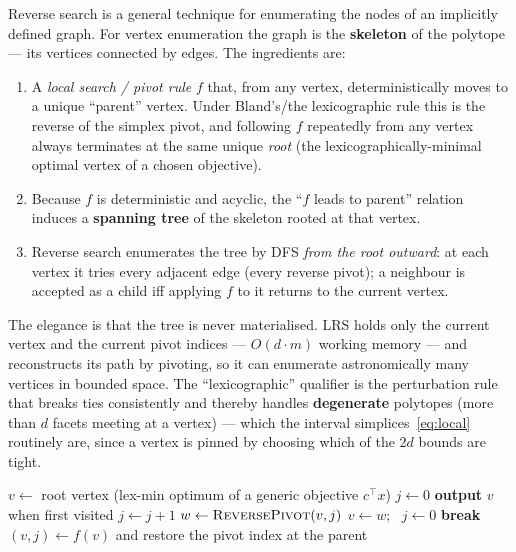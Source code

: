 \documentclass[11pt]{article}
\begin{document}
Reverse search is a general technique for enumerating the nodes of an implicitly defined
graph. For vertex enumeration the graph is the \textbf{skeleton} of the polytope --- its
vertices connected by edges. The ingredients are:
\begin{enumerate}
  \item A \emph{local search / pivot rule} $f$ that, from any vertex, deterministically
    moves to a unique ``parent'' vertex. Under Bland's/the lexicographic rule this is
    the reverse of the simplex pivot, and following $f$ repeatedly from any vertex always
    terminates at the same unique \emph{root} (the lexicographically-minimal optimal
    vertex of a chosen objective).
  \item Because $f$ is deterministic and acyclic, the ``$f$ leads to parent'' relation
    induces a \textbf{spanning tree} of the skeleton rooted at that vertex.
  \item Reverse search enumerates the tree by DFS \emph{from the root outward}: at each
    vertex it tries every adjacent edge (every reverse pivot); a neighbour is accepted
    as a child iff applying $f$ to it returns to the current vertex.
\end{enumerate}
The elegance is that the tree is never materialised. LRS holds only the current vertex
and the current pivot indices --- $O(d\cdot m)$ working memory --- and reconstructs its
path by pivoting, so it can enumerate astronomically many vertices in bounded space.
The ``lexicographic'' qualifier is the perturbation rule that breaks ties consistently
and thereby handles \textbf{degenerate} polytopes (more than $d$ facets meeting at a
vertex) --- which the interval simplices~\eqref{eq:local} routinely are, since a vertex
is pinned by choosing which of the $2d$ bounds are tight.

\begin{algorithm}[t]
\caption{Reverse search vertex enumeration (schematic)}
\label{alg:lrs}
\begin{algorithmic}[1]
  \State $v \gets$ root vertex (lex-min optimum of a generic objective $c^\top x$)
  \State $j \gets 0$ 
  \Repeat
    \State \textbf{output} $v$ when first visited
      \State $j \gets j+1$
      \State $w \gets \textsc{ReversePivot}(v, j)$
       
        \State $v \gets w$; \ $j \gets 0$ 
        \State \textbf{break}
      \EndIf
    \EndWhile
      \State $(v, j) \gets f(v)$ and restore the pivot index at the parent
    \EndIf
\EndProcedure
\end{algorithmic}
\end{algorithm}
\end{document}
